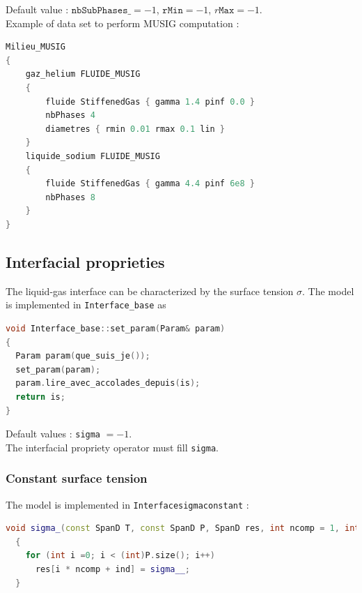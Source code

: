 Default value : $\texttt{nbSubPhases\_} = -1$, $\texttt{rMin}=-1$, $r\texttt{Max}=-1$.\\
Example of data set to perform MUSIG computation : 
\begin{lstlisting}[language=c++]
Milieu_MUSIG
{
    gaz_helium FLUIDE_MUSIG
    {
        fluide StiffenedGas { gamma 1.4 pinf 0.0 }
        nbPhases 4
        diametres { rmin 0.01 rmax 0.1 lin }
    }
    liquide_sodium FLUIDE_MUSIG
    {
        fluide StiffenedGas { gamma 4.4 pinf 6e8 }
        nbPhases 8
    }
}
\end{lstlisting}

\subsection{Interfacial proprieties}
The liquid-gas interface can be characterized by the surface tension $\sigma$.
The model is implemented in \texttt{Interface\_base} as 
\begin{lstlisting}[language=c++]
void Interface_base::set_param(Param& param)
{
  Param param(que_suis_je());
  set_param(param);
  param.lire_avec_accolades_depuis(is);
  return is;
}
\end{lstlisting}
Default values : \texttt{sigma\textunderscore \textunderscore} $= -1.$\\
The interfacial propriety operator must fill \texttt{sigma\textunderscore}.

\subsubsection{Constant surface tension}
The model is implemented in \texttt{Interface\textunderscore sigma\textunderscore constant} :
\begin{lstlisting}[language=c++]
void sigma_(const SpanD T, const SpanD P, SpanD res, int ncomp = 1, int ind = 0) const override
  {
    for (int i =0; i < (int)P.size(); i++) 
      res[i * ncomp + ind] = sigma__;
  }
\end{lstlisting}

